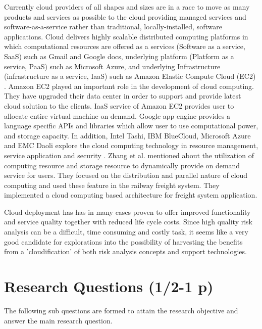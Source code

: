 \documentclass[a4paper,twoside,10pt]{report}
\begin{document}
Currently cloud providers of all shapes and sizes are in a race to move as many products and services as possible to the cloud providing managed services and software-as-a-service rather than traditional, locally-installed, software applications. Cloud delivers highly scalable distributed computing platforms in which computational resources are offered as a services (Software as a service, SaaS) such as Gmail and Google docs, underlying platform (Platform as a service, PaaS) such as Microsoft Azure, and underlying Infrastructure (infrastructure as a service, IaaS) such as Amazon Elastic Compute Cloud (EC2) \cite{amazonec2}. Amazon EC2 played an important role in the development of cloud computing. They have upgraded their data center in order to support and provide latest cloud solution to the clients. IaaS service of Amazon EC2 provides user to allocate entire virtual machine on demand. Google app engine provides a language specific APIs and libraries which allow user to use computational power, and storage capacity.  In addition, Intel Tashi, IBM BlueCloud, Microsoft Azure and EMC Daoli explore the cloud computing technology in resource management, service application and security \cite{zhangmiaobook}. Zhang et al. \cite{zhangmiaobook} mentioned about the utilization of computing resource and storage resource to dynamically provide on demand service for users. They focused on the distribution and parallel nature of cloud computing and used these feature in the railway freight system. They implemented a cloud computing based architecture for freight system application.

Cloud deployment has has in many cases proven to offer improved functionality and service quality together with reduced life cycle costs. Since high quality risk analysis can be a difficult, time consuming and costly task, it seems like a very good candidate for explorations into the possibility of harvesting the benefits from a 'cloudification' of both risk analysis concepts and support technologies.    
 
 
\section{Research Questions (1/2-1 p)}\label{ResQues}

The following sub questions are formed to attain the research objective and answer the main research question. 
\end{document}
